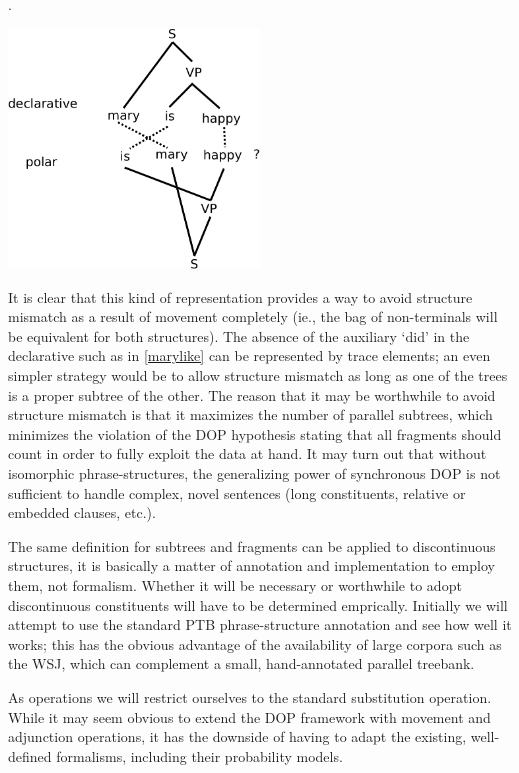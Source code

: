 \documentclass[a4paper]{article}
\theoremstyle{definition}
\begin{document}
\ex. \label{marydiscont}

\begin{center}
\includegraphics[width=0.5\textwidth]{maryishappy-crop.pdf}
\end{center}
\vspace{1em}

It is clear that this kind of representation provides a way to avoid structure
mismatch as a result of movement completely (ie., the bag of non-terminals will
be equivalent for both structures). The absence of the auxiliary `did' in the
declarative such as in \ref{marylike} can be represented by trace elements; an
even simpler strategy would be to allow structure mismatch as long as one of
the trees is a proper subtree of the other. The reason that it may be
worthwhile to avoid structure mismatch is that it maximizes the number of
parallel subtrees, which minimizes the violation of the DOP hypothesis stating
that all fragments should count in order to fully exploit the data at hand. It
may turn out that without isomorphic phrase-structures, the generalizing power
of synchronous DOP is not sufficient to handle complex, novel sentences (long
constituents, relative or embedded clauses, etc.).

The same definition for subtrees and fragments can be applied to discontinuous
structures, it is basically a matter of annotation and implementation to employ
them, not formalism.  Whether it will be necessary or worthwhile to adopt
discontinuous constituents will have to be determined emprically. Initially we
will attempt to use the standard PTB phrase-structure annotation and see how well
it works; this has the obvious advantage of the availability of large corpora such
as the WSJ, which can complement a small, hand-annotated parallel treebank.

As operations we will restrict ourselves to the standard substitution operation. While
it may seem obvious to extend the DOP framework with movement and adjunction operations,
it has the downside of having to adapt the existing, well-defined formalisms,
including their probability models.
\end{document}
